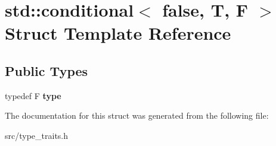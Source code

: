 \hypertarget{structstd_1_1conditional_3_01false_00_01T_00_01F_01_4}{}\section{std\+:\+:conditional$<$ false, T, F $>$ Struct Template Reference}
\label{structstd_1_1conditional_3_01false_00_01T_00_01F_01_4}
\subsection*{Public Types}
\begin{DoxyCompactItemize}
\item 
typedef F {\bfseries type}\hypertarget{structstd_1_1conditional_3_01false_00_01T_00_01F_01_4_a8307a0010d68b8c7f309a910bb6137fe}{}\label{structstd_1_1conditional_3_01false_00_01T_00_01F_01_4_a8307a0010d68b8c7f309a910bb6137fe}

\end{DoxyCompactItemize}


The documentation for this struct was generated from the following file\+:\begin{DoxyCompactItemize}
\item 
src/type\+\_\+traits.\+h\end{DoxyCompactItemize}
